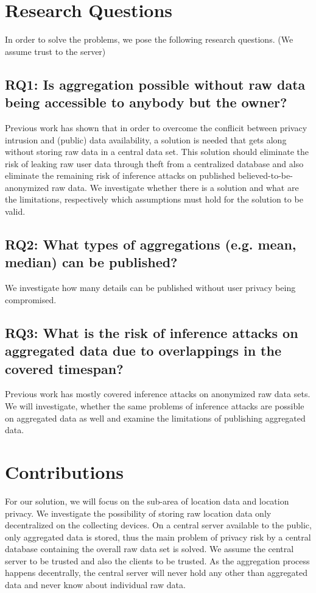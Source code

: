 \section{Research Questions}
In order to solve the problems, we pose the following research questions. (We assume trust to the server)

\subsection*{RQ1: Is aggregation possible without raw data being accessible to anybody but the owner?}
Previous work has shown that in order to overcome the conflicit between privacy intrusion and (public) data availability, a solution is needed that gets along without storing raw data in a central data set.
This solution should eliminate the risk of leaking raw user data through theft from a centralized database and also eliminate the remaining risk of inference attacks on published believed-to-be-anonymized raw data. We investigate whether there is a solution and what are the limitations, respectively which assumptions must hold for the solution to be valid.

\subsection*{RQ2: What types of aggregations (e.g. mean, median) can be published?}
We investigate how many details can be published without user privacy being compromised.

\subsection*{RQ3: What is the risk of inference attacks on aggregated data due to overlappings in the covered timespan?}
Previous work has mostly covered inference attacks on anonymized raw data sets. We will investigate, whether the same problems of inference attacks are possible on aggregated data as well and examine the limitations of publishing aggregated data.

\section{Contributions}
For our solution, we will focus on the sub-area of location data and location privacy.
We investigate the possibility of storing raw location data only decentralized on the collecting devices. On a central server available to the public, only aggregated data is stored, thus the main problem of privacy risk by a central database containing the overall raw data set is solved. We assume the central server to be trusted and also the clients to be trusted. As the aggregation process happens decentrally, the central server will never hold any other than aggregated data and never know about individual raw data. 

